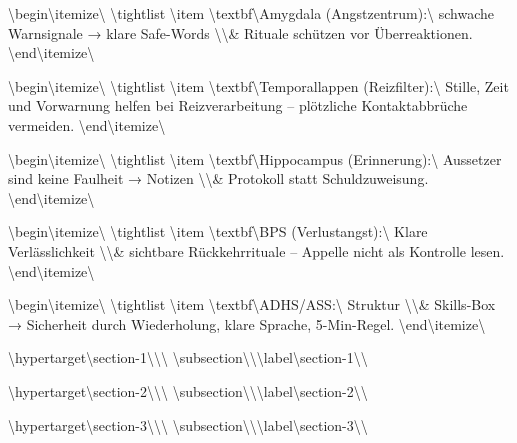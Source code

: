 \textbackslash{}begin\textbackslash{}{itemize\textbackslash{}}
\textbackslash{}tightlist
\textbackslash{}item
  \textbackslash{}textbf\textbackslash{}{Amygdala (Angstzentrum):\textbackslash{}} schwache Warnsignale → klare Safe-Words \textbackslash{}\textbackslash{}& Rituale schützen vor Überreaktionen.
\textbackslash{}end\textbackslash{}{itemize\textbackslash{}}

\textbackslash{}begin\textbackslash{}{itemize\textbackslash{}}
\textbackslash{}tightlist
\textbackslash{}item
  \textbackslash{}textbf\textbackslash{}{Temporallappen (Reizfilter):\textbackslash{}} Stille, Zeit und Vorwarnung helfen bei Reizverarbeitung -- plötzliche Kontaktabbrüche vermeiden.
\textbackslash{}end\textbackslash{}{itemize\textbackslash{}}

\textbackslash{}begin\textbackslash{}{itemize\textbackslash{}}
\textbackslash{}tightlist
\textbackslash{}item
  \textbackslash{}textbf\textbackslash{}{Hippocampus (Erinnerung):\textbackslash{}} Aussetzer sind keine Faulheit → Notizen \textbackslash{}\textbackslash{}& Protokoll statt Schuldzuweisung.
\textbackslash{}end\textbackslash{}{itemize\textbackslash{}}

\textbackslash{}begin\textbackslash{}{itemize\textbackslash{}}
\textbackslash{}tightlist
\textbackslash{}item
  \textbackslash{}textbf\textbackslash{}{BPS (Verlustangst):\textbackslash{}} Klare Verlässlichkeit \textbackslash{}\textbackslash{}& sichtbare Rückkehrrituale -- Appelle nicht als Kontrolle lesen.
\textbackslash{}end\textbackslash{}{itemize\textbackslash{}}

\textbackslash{}begin\textbackslash{}{itemize\textbackslash{}}
\textbackslash{}tightlist
\textbackslash{}item
  \textbackslash{}textbf\textbackslash{}{ADHS/ASS:\textbackslash{}} Struktur \textbackslash{}\textbackslash{}& Skills-Box → Sicherheit durch Wiederholung, klare Sprache, 5-Min-Regel.
\textbackslash{}end\textbackslash{}{itemize\textbackslash{}}

\textbackslash{}hypertarget\textbackslash{}{section-1\textbackslash{}}\textbackslash{}{\textbackslash{}%
\textbackslash{}subsection\textbackslash{}{\textbackslash{}}\textbackslash{}label\textbackslash{}{section-1\textbackslash{}}\textbackslash{}}

\textbackslash{}hypertarget\textbackslash{}{section-2\textbackslash{}}\textbackslash{}{\textbackslash{}%
\textbackslash{}subsection\textbackslash{}{\textbackslash{}}\textbackslash{}label\textbackslash{}{section-2\textbackslash{}}\textbackslash{}}

\textbackslash{}hypertarget\textbackslash{}{section-3\textbackslash{}}\textbackslash{}{\textbackslash{}%
\textbackslash{}subsection\textbackslash{}{\textbackslash{}}\textbackslash{}label\textbackslash{}{section-3\textbackslash{}}\textbackslash{}}


